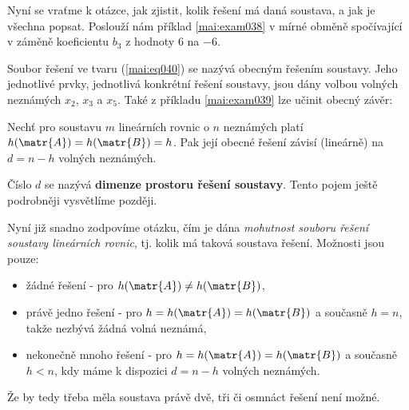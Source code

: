       Nyní se vraťme k otázce, jak zjistit, kolik řešení má daná soustava, a jak je všechna popsat.
      Poslouží nám příklad \ref{mai:exam038} v mírné obměně spočívající v záměně koeficientu \(b_3\)
      z hodnoty \num{6} na \num{-6}.
      
      
      
      Soubor řešení ve tvaru (\ref{mai:eq040}) se nazývá obecným řešením soustavy. Jeho jednotlivé
      prvky, jednotlivá konkrétní řešení soustavy, jsou dány volbou volných neznámých \(x_2\),
      \(x_3\) a \(x_5\). Také z příkladu \ref{mai:exam039} lze učinit obecný závěr:
      
      \begin{lemma}\label{mai:lemma002}
        Nechť pro soustavu \(m\) lineárních rovnic o \(n\) neznámých platí \(h(\matr{A}) =
        h(\matr{B}) = h\). Pak její obecné řešení závisí (lineárně) na \(d = n - h\) volných
        neznámých.
      \end{lemma}
      
      Číslo \(d\) se nazývá \textbf{dimenze prostoru řešení soustavy}. Tento pojem ještě podrobněji
      vysvětlíme později.
      
      Nyní již snadno zodpovíme otázku, čím je dána \emph{mohutnost souboru řešení soustavy
      lineárních rovnic}, tj. kolik má taková soustava řešení. Možnosti jsou pouze:
      \begin{mdframed}[style=highlight]
        \begin{itemize}[leftmargin=3pt,noitemsep]
          \item žádné řešení - pro \(h(\matr{A}) \neq h(\matr{B})\),
          \item právě jedno řešení - pro \(h = h(\matr{A}) = h(\matr{B})\) a současně \(h = n\),
                takže nezbývá žádná volná neznámá,
          \item nekonečně mnoho řešení - pro \(h = h(\matr{A}) = h(\matr{B})\) a současně \(h < n\),
                kdy máme k dispozici \(d = n - h\) volných neznámých.
        \end{itemize}  
      \end{mdframed}  
      Že by tedy třeba měla soustava právě dvě, tři či osmnáct řešení není možné.
      
